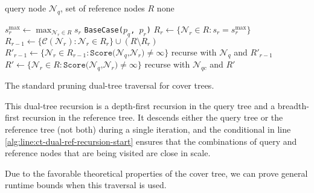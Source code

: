 \begin{algorithm}[htb]
  \begin{algorithmic}[1]
     query node $\mathscr{N}_q$, set of reference nodes
$R$ \label{alg:line:ct-dual-input}
     none

    \medskip
    \STATE $s^{\max}_r \gets \max_{\mathscr{N}_r \in R} s_r$
\label{alg:line:ct-dual-ref-recursion-start}
       \label{alg:line:ct-dual-base-case-start}
        \STATE \texttt{BaseCase($p_q$, $p_r$)}
      \ENDFOR \label{alg:line:ct-dual-base-case-end}
      \STATE $R_r \gets \{ \mathscr{N}_r \in R : s_r = s^{\max}_r \}$
\label{alg:line:ct-dual-ref-set}
      \STATE $R_{r - 1} \gets \{ \mathscr{C}(\mathscr{N}_r) : \mathscr{N}_r \in
R_r \} \cup (R \setminus R_r)$ \label{alg:line:ct-dual-ref-children}
      \STATE $R'_{r - 1} \gets \{ \mathscr{N}_r \in R_{r - 1} :
\texttt{Score(}\mathscr{N}_q\texttt{,} \mathscr{N}_r\texttt{)} \ne \infty \}$
\label{alg:line:ct-dual-ref-score}
      \STATE recurse with $\mathscr{N}_q$ and $R'_{r - 1}$
\label{alg:line:ct-dual-ref-recursion-end}
    \ELSE \label{alg:line:ct-dual-query-recursion-start}
        \STATE $R' \gets \{ \mathscr{N}_r \in R :
\texttt{Score(}\mathscr{N}_q\texttt{,} \mathscr{N}_r\texttt{)} \ne \infty \}$
\label{alg:line:ct-dual-query-pruning}
        \STATE recurse with $\mathscr{N}_{qc}$ and $R'$
\label{alg:line:ct-dual-query-recursion}
      \ENDFOR \label{alg:line:ct-dual-query-recursion-end}
    \ENDIF
  \end{algorithmic}
  \caption{The standard pruning dual-tree traversal for cover trees.}
  \label{alg:cover-tree-dual}
\end{algorithm}

This dual-tree recursion is a depth-first recursion in the query tree and a
breadth-first recursion in the reference tree.  It descends either the query
tree or the reference tree (not both) during a single iteration, and the
conditional in line \ref{alg:line:ct-dual-ref-recursion-start} ensures that the
combinations of query and reference nodes that are being visited are close in
scale.

Due to the favorable theoretical properties of the cover tree, we can prove
general runtime bounds when this traversal is used.

